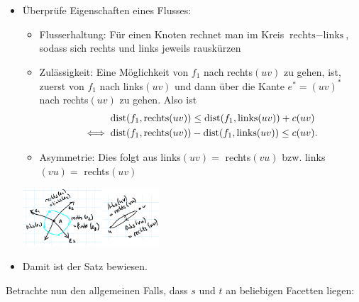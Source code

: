 \begin{itemize}
\begin{center}
	\end{center}
	\item Überprüfe Eigenschaften eines Flusses:
	\begin{itemize}
		\item Flusserhaltung: Für einen Knoten rechnet man im Kreis $\text{rechts}-\text{links}$, sodass sich rechts und links jeweils rauskürzen
		\item Zulässigkeit: Eine Möglichkeit von $f_1$ nach rechts$(uv)$ zu gehen, ist, zuerst von $f_1$ nach links$(uv)$ und dann über die Kante $e^*=(uv)^*$ nach rechts$(uv)$ zu gehen. Also ist 
		\begin{align*}
			&\vphantom{ } \text{dist}(f_1, \text{rechts}(uv))\leq \text{dist}(f_1, \text{links}(uv)) + c(uv) \\
			\iff{}& \text{dist}(f_1, \text{rechts}(uv)) - \text{dist}(f_1, \text{links}(uv)) \leq c(uv).
		\end{align*}
		\item Asymmetrie: Dies folgt aus links$(uv)=$ rechts$(vu)$ bzw. links$(vu)=$ rechts$(uv)$
	\end{itemize}
	\begin{center}
		\includegraphics[width=0.4\textwidth]{images/max-flow-3.png}
	\end{center}
	\item Damit ist der Satz bewiesen.
\end{itemize}
\bigskip
Betrachte nun den allgemeinen Falls, dass $s$ und $t$ an beliebigen Facetten liegen:
